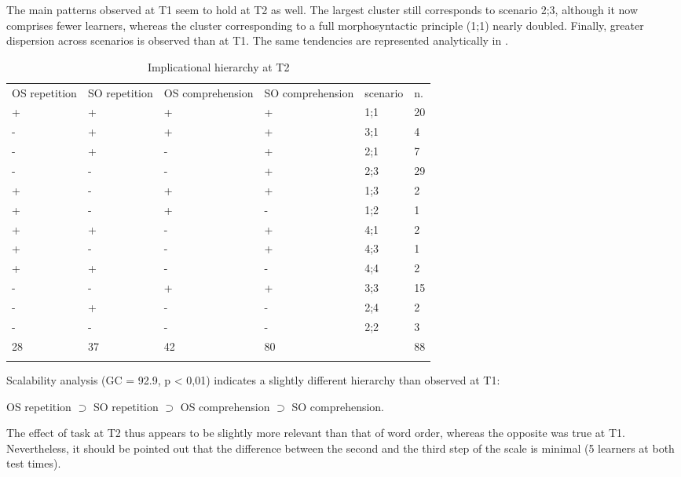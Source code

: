 The main patterns observed at T1 seem to hold at T2 as well. The largest cluster still corresponds to scenario 2;3, although it now comprises fewer learners, whereas the cluster corresponding to a full morphosyntactic principle (1;1) nearly doubled. Finally, greater dispersion across scenarios is observed than at T1. The same tendencies are represented analytically in . 

\begin{table}
    \begin{tabularx}{\textwidth}{XXXXXX}
        \lsptoprule
        OS repetition & SO repetition & OS comprehension & SO comprehension & scenario & n. \\
         + & + & + & + & 1;1 & 20\\
         {}- & + & + & + & 3;1 & 4\\
         {}- & + & {}- & + & 2;1 & 7\\
         {}- & {}- & {}- & + & 2;3 & 29\\
         + & {}- & + & + & 1;3 & 2\\
         + & {}- & + & {}- & 1;2 & 1\\
         + & + & {}- & + & 4;1 & 2\\
         + & {}- & {}- & + & 4;3 & 1\\
         + & + & {}- & {}- & 4;4 & 2\\
         {}- & {}- & + & + & 3;3 & 15\\
         {}- & + & {}- & {}- & 2;4 & 2\\
         {}- & {}- & {}- & {}- & 2;2 & 3\\
         28 & 37 & 42 & 80 &  & 88\\
        \lspbottomrule
    \end{tabularx}
    \caption{Implicational hierarchy at T2}
    \label{tab:06:5}
\end{table}

Scalability analysis (GC = 92.9, p < 0,01) indicates a slightly different hierarchy than observed at T1:

OS repetition ${\supset}$ SO repetition ${\supset}$ OS comprehension ${\supset}$ SO comprehension. 

The effect of task at T2 thus appears to be slightly more relevant than that of word order, whereas the opposite was true at T1. Nevertheless, it should be pointed out that the difference between the second and the third step of the scale is minimal (5 learners at both test times).

